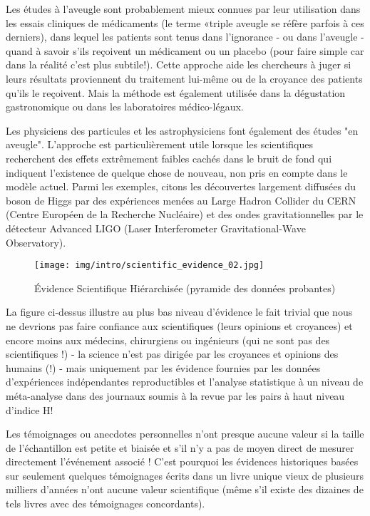	Les \'etudes à l'aveugle sont probablement mieux connues par leur utilisation dans les essais cliniques de m\'edicaments (le terme «triple aveugle se r\'efère parfois à ces derniers), dans lequel les patients sont tenus dans l'ignorance - ou dans l'aveugle - quand à savoir s'ils reçoivent un m\'edicament ou un placebo (pour faire simple car dans la r\'ealit\'e c'est plus subtile!). Cette approche aide les chercheurs à juger si leurs r\'esultats proviennent du traitement lui-même ou de la croyance des patients qu'ils le reçoivent. Mais la m\'ethode est \'egalement utilis\'ee dans la d\'egustation gastronomique ou dans les laboratoires m\'edico-l\'egaux.
	
	Les physiciens des particules et les astrophysiciens font \'egalement des \'etudes "en aveugle". L'approche est particulièrement utile lorsque les scientifiques recherchent des effets extrêmement faibles cach\'es dans le bruit de fond qui indiquent l'existence de quelque chose de nouveau, non pris en compte dans le modèle actuel. Parmi les exemples, citons les d\'ecouvertes largement diffus\'ees du boson de Higgs par des exp\'eriences men\'ees au Large Hadron Collider du CERN (Centre Europ\'een de la Recherche Nucl\'eaire) et des ondes gravitationnelles par le d\'etecteur Advanced LIGO (Laser Interferometer Gravitational-Wave Observatory).
	\begin{figure}[H]
		\centering
		\texttt{[image: img/intro/scientific\_evidence\_02.jpg]}
		\caption{\'Evidence Scientifique Hi\'erarchis\'ee (pyramide des données probantes)}
	\end{figure}
	
	La figure ci-dessus illustre au plus bas niveau d'évidence le fait trivial que nous ne devrions pas faire confiance aux scientifiques (leurs opinions et croyances) et encore moins aux médecins, chirurgiens ou ingénieurs (qui ne sont pas des scientifiques !) - la science n'est pas dirigée par les croyances et opinions des humains (!) - mais uniquement par les évidence fournies par les données d'expériences indépendantes reproductibles et l'analyse statistique à un niveau de méta-analyse dans des journaux soumis à la revue par les pairs à haut niveau d'indice H!
	
	\begin{tcolorbox}[title=Remarque,colframe=black,arc=10pt]
	Les témoignages ou anecdotes personnelles n'ont presque aucune valeur si la taille de l'échantillon est petite et biaisée et s'il n'y a pas de moyen direct de mesurer directement l'événement associé ! C'est pourquoi les évidences historiques basées sur seulement quelques témoignages écrits dans un livre unique vieux de plusieurs milliers d'années n'ont aucune valeur scientifique (même s'il existe des dizaines de tels livres avec des témoignages concordants).
	\end{tcolorbox}
	
